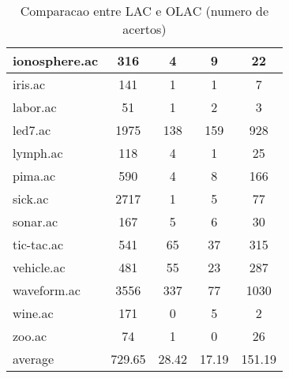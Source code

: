 \begin{table}[htbp]
\begin{tabular}{|l|c|c|c|c|}
		\hline
		ionosphere.ac   & 316           & 4                  & 9                        & 22                            \\
		\hline
		iris.ac         & 141           & 1                  & 1                        & 7                             \\
		\hline
		labor.ac        & 51            & 1                  & 2                        & 3                             \\
		\hline
		led7.ac         & 1975          & 138                & 159                      & 928                           \\
		\hline
		lymph.ac        & 118           & 4                  & 1                        & 25                            \\
		\hline
		pima.ac         & 590           & 4                  & 8                        & 166                           \\
		\hline
		sick.ac         & 2717          & 1                  & 5                        & 77                            \\
		\hline
		sonar.ac        & 167           & 5                  & 6                        & 30                            \\
		\hline
		tic-tac.ac      & 541           & 65                 & 37                       & 315                           \\
		\hline
		vehicle.ac      & 481           & 55                 & 23                       & 287                           \\
		\hline
		waveform.ac     & 3556          & 337                & 77                       & 1030                          \\
		\hline
		wine.ac         & 171           & 0                  & 5                        & 2                             \\
		\hline
		zoo.ac          & 74            & 1                  & 0                        & 26                            \\
		\hline
		average         & 729.65        & 28.42              & 17.19                    & 151.19                        \\
		\hline
		\end{tabular}
	\caption{Comparacao entre LAC e OLAC (numero de acertos)}
	\label{tab:comparison_lac_olac}
\end{table}